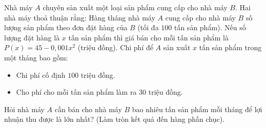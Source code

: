 \begin{bt}%
	Nhà máy $A$ chuyên sản xuất một loại sản phẩm cung cấp cho nhà máy $B$. Hai nhà máy thoả thuận rằng: Hàng tháng nhà máy $A$ cung cấp cho nhà máy $B$ số lượng sản phẩm theo đơn đặt hàng của $B$ (tối đa $100$ tấn sản phẩm). Nếu số lượng đặt hàng là $x$ tấn sản phẩm thì giá bán cho mỗi tấn sản phẩm là $P(x)=45-0{,}001 x^2$ (triệu đồng).  Chi phí để $A$ sản xuất $x$ tấn sản phẩm trong một tháng bao gồm:
	\begin{itemize}
		\item Chi phí cố  định $100$ triệu đồng.
		\item Cho  phí cho mỗi tấn sản phẩm làm ra $30$ triệu đồng.
	\end{itemize}
	Hỏi nhà máy $A$ cần bán cho nhà máy $B$ bao  nhiêu tấn sản phẩm mỗi tháng để lợi nhuận thu được là lớn nhất? (Làm tròn kết quả đến hàng phần chục).
\end{bt}

